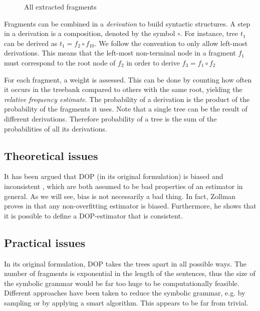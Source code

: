 \begin{figure}[h!]
\center 
\caption{All extracted fragments}
\label{f:fragments}
\end{figure}


Fragments can be combined in a \emph{derivation} to build syntactic structures. A step in a derivation is a composition, denoted by the symbol $\circ$. For instance, tree $t_1$ can be derived as $t_1=f_2\circ f_{10}$. We follow the convention to only allow left-most derivations. This means that the left-most non-terminal node in a fragment $f_1$ must correspond to the root node of $f_2$ in order to derive $f_3=f_1\circ f_2$

For each fragment, a weight is assessed. This can be done by counting how often it occurs in the treebank compared to others with the same root, yielding the \emph{relative frequency estimate}. The probability of a derivation is the product of the probability of the fragments it uses. Note that a single tree can be the result of different derivations. Therefore probability of a tree is the sum of the probabilities of all its derivations.

\subsection{Theoretical issues}
It has been argued that DOP (in its original formulation) is biased and inconsistent \cite{johnson2002}, which are both assumed to be bad properties of an estimator in general. As we will see, bias is not necessarily a bad thing. In fact, Zollman proves in  \cite{zollmann2005} that any non-overfitting estimator is biased. Furthermore, he shows that it is possible to define a DOP-estimator that is consistent.


\subsection{Practical issues}
In its original formulation, DOP takes the trees apart in all possible ways. The number of fragments is exponential in the length of the sentences, thus the size of the symbolic grammar would be far too huge to be computationally feasible. 
Different approaches have been taken to reduce the symbolic grammar, e.g. by sampling or by applying a smart algorithm. This appears to be far from trivial.


